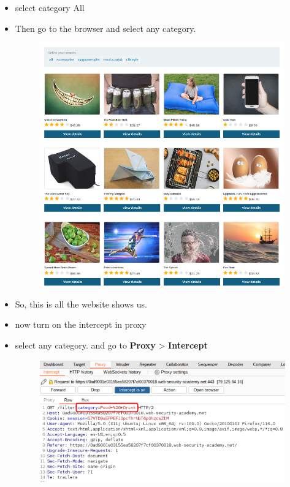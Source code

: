\documentclass[
	a4paper, %
	12pt, %
]{CSSullivanBusinessReport}
\begin{document}
\begin{fullwidth}
\begin{itemize}
    \item select category All 
    \item Then go to the browser and select any category.
    \begin{figure}[H]
        \centering
        \includegraphics[width=1\linewidth]{Images//sql injection/category_all.png}        
    \end{figure}
    \item So, this is all the website shows us.
    \item now turn on the intercept in proxy 
    \item select any category. and go to {\color{orange}\textbf{Proxy}} > {\color{orange}\textbf{Intercept}}
    \begin{figure}[H]
        \centering
        \includegraphics[width=1\linewidth]{Images//sql injection/in_intercept.png}    

\end{figure}
\end{itemize}
\end{fullwidth}
\end{document}
